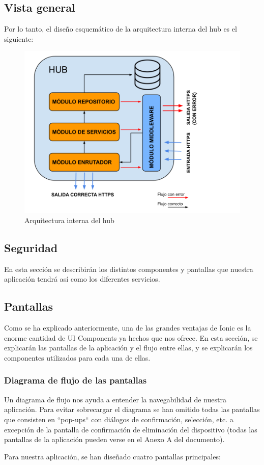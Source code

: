 \subsection{Vista general}
Por lo tanto, el diseño esquemático de la arquitectura interna del hub es el siguiente:
\begin{figure}[H]
\centering
\includegraphics[width=6.00in]{images/arquitectura_hub.png}
\caption{Arquitectura interna del hub}
\label{fig:arquitectura_hub}
\end{figure}
\subsection{Seguridad}
En esta sección se describirán los distintos componentes y pantallas que nuestra aplicación tendrá así como los diferentes servicios. 
\subsection{Pantallas}
Como se ha explicado anteriormente, una de las grandes ventajas de Ionic es la enorme cantidad de UI Components ya hechos que nos ofrece.
En esta sección, se explicarán las pantallas de la aplicación y el flujo entre ellas, y se explicarán los componentes utilizados para cada
una de ellas.
\subsubsection{Diagrama de flujo de las pantallas}
Un diagrama de flujo nos ayuda a entender la navegabilidad de nuestra aplicación. Para evitar sobrecargar el diagrama se han omitido todas
las pantallas que consisten en ``pop-ups`` con diálogos de confirmación, selección, etc. a excepción de la pantalla de confirmación de eliminación del
dispositivo (todas las pantallas de la aplicación pueden verse en el Anexo A del documento).
\par
Para nuestra aplicación, se han diseñado cuatro pantallas principales:

